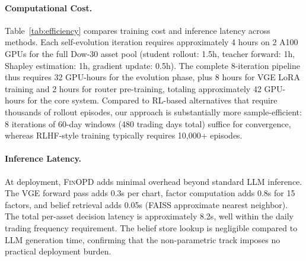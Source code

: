 \paragraph{Computational Cost.} Table~\ref{tab:efficiency} compares training cost and inference latency across methods. Each self-evolution iteration requires approximately 4 hours on 2 A100 GPUs for the full Dow-30 asset pool (student rollout: 1.5h, teacher forward: 1h, Shapley estimation: 1h, gradient update: 0.5h). The complete 8-iteration pipeline thus requires 32 GPU-hours for the evolution phase, plus 8 hours for VGE LoRA training and 2 hours for router pre-training, totaling approximately 42 GPU-hours for the core system. Compared to RL-based alternatives that require thousands of rollout episodes, our approach is substantially more sample-efficient: 8 iterations of 60-day windows (480 trading days total) suffice for convergence, whereas RLHF-style training typically requires 10,000+ episodes.

\paragraph{Inference Latency.} At deployment, \textsc{FinOPD} adds minimal overhead beyond standard LLM inference. The VGE forward pass adds 0.3s per chart, factor computation adds 0.8s for 15 factors, and belief retrieval adds 0.05s (FAISS approximate nearest neighbor). The total per-asset decision latency is approximately 8.2s, well within the daily trading frequency requirement. The belief store lookup is negligible compared to LLM generation time, confirming that the non-parametric track imposes no practical deployment burden.
